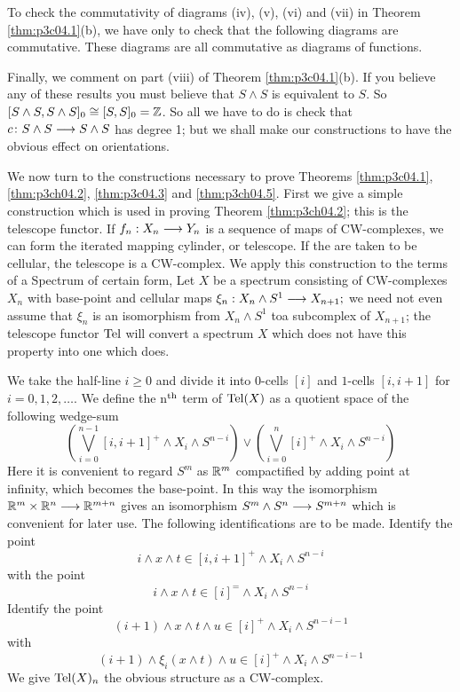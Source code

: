 \documentclass[../main]{subfiles}
\begin{document}
To check the commutativity of diagrams (iv), (v), (vi) and (vii) in
Theorem \ref{thm:p3c04.1}(b), we have only to check that the following diagrams are
commutative.
These diagrams are all commutative as diagrams of functions. 

Finally, we comment on part (viii) of Theorem \ref{thm:p3c04.1}(b). If you believe any of these results you must believe that $S\wedge S$ is equivalent to $S$. So $[S\wedge S,S\wedge S]_0 \cong [S,S]_0 = \mathbb{Z}$. So all we have to do is check that $c\colon S\wedge S \longrightarrow S\wedge S$ has degree 1; but we shall make our constructions to have the obvious effect on orientations.

We now turn to the constructions necessary to prove Theorems \ref{thm:p3c04.1},
\ref{thm:p3ch04.2}, \ref{thm:p3c04.3} and \ref{thm:p3ch04.5}. First we give a simple construction which is used in
proving Theorem \ref{thm:p3ch04.2}; this is the telescope functor. If $f_n:X_n\overset{}{\longrightarrow}Y_n$
is a sequence of maps of CW-complexes, we can form the iterated
mapping cylinder, or telescope. If the are taken to be cellular, the
telescope is a CW-complex. We apply this construction to the terms of
a Spectrum of certain form, Let $X$ be a spectrum consisting of CW-complexes $X_n$ with base-point and cellular maps $\xi_n:X_n\wedge S^1\overset{}{\longrightarrow}X_{n+1} ;$
 we need not even assume that $\xi_n$ is an isomorphism from $X_n\wedge S^1$ toa
subcomplex of $X_{n+1}$; the telescope functor $\mathop{\mathrm{Tel}}$ will convert a spectrum
$X$ which does not have this property into one which does. 

We take the half-line $i\geq 0$ and divide it into $0$-cells $[i]$ and $1$-cells $[i,i+1]$ for $i=0,1,2,\dots$. We define the n$^{\text{th}}$ term of $\mathop{\mathrm{Tel}}(X)$ as a quotient space of the following wedge-sum
$$\left(\bigvee_{i=0}^{n-1} [i,i+1]^+\wedge X_i\wedge S^{n-i} \right)\vee \left(\bigvee_{i=0}^n [i]^+\wedge X_i\wedge S^{n-i}\right) $$
Here it is convenient to regard $S^m$ as $\mathbb{R}^m$ compactified by adding point at infinity, which becomes the base-point. In this way the isomorphism $\mathbb{R}^m\times \mathbb{R}^n \overset{}{\longrightarrow} \mathbb{R}^{m+n}$ gives an isomorphism $S^m\wedge S^n \overset{}{\longrightarrow} S^{m+n}$ which is convenient for later use. The following identifications are to
be made. Identify the point 
$$i\wedge x\wedge t\in [i,i+1]^+ \wedge X_i \wedge S^{n-i} $$
with the point $$i\wedge x\wedge t \in [i]^=\wedge X_i\wedge S^{n-i} $$
Identify the point $$(i+1)\wedge x\wedge t\wedge u\in [i]^+\wedge X_i\wedge S^{n-i-1}$$
with
$$(i+1)\wedge \xi_i(x\wedge t)\wedge u\in [i]^+\wedge X_i\wedge S^{n-i-1}$$
We give $\mathop{\mathrm{Tel}}(X)_n$ the obvious structure as a CW-complex.
\end{document}
